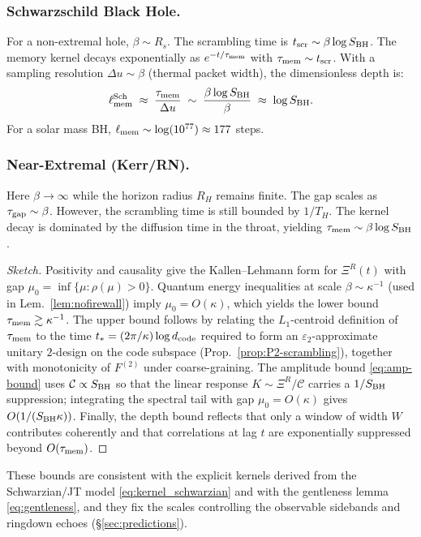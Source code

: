 \documentclass[aps,prd,preprint,onecolumn,superscriptaddress,nofootinbib,longbibliography,floatfix,11pt,showpacs,showkeys]{revtex4-2}
\theoremstyle{plain}
\theoremstyle{definition}
\theoremstyle{remark}
\begin{document}
\subsubsection{Schwarzschild Black Hole.}
For a non-extremal hole, $\beta \sim R_s$. The scrambling time is $t_{\rm scr} \sim \beta \log S_{\rm BH}$.
The memory kernel decays exponentially as $e^{-t/\tau_{\rm mem}}$ with $\tau_{\rm mem} \sim t_{\rm scr}$.
With a sampling resolution $\Delta u \sim \beta$ (thermal packet width), the dimensionless depth is:
\[
\ell_{\rm mem}^{\text{Sch}} \;\approx\; \frac{\tau_{\rm mem}}{\Delta u} \;\sim\; \frac{\beta \log S_{\rm BH}}{\beta} \;\approx\; \log S_{\rm BH}.
\]
For a solar mass BH, $\ell_{\rm mem} \sim \log(10^{77}) \approx 177$ steps.

\subsubsection{Near-Extremal (Kerr/RN).}
Here $\beta \to \infty$ while the horizon radius $R_H$ remains finite. The gap scales as $\tau_{\rm gap} \sim \beta$.
However, the scrambling time is still bounded by $1/T_H$.
The kernel decay is dominated by the diffusion time in the throat, yielding $\tau_{\rm mem} \sim \beta \log S_{\rm BH}$.

\begin{proof}[Sketch]
Positivity and causality give the Kallen--Lehmann form for $\Xi^R(t)$ with gap $\mu_0=\inf\{\mu:\rho(\mu)\!>\!0\}$. Quantum energy
inequalities at scale $\beta\sim\kappa^{-1}$ (used in Lem.~\ref{lem:nofirewall}) imply $\mu_0=O(\kappa)$, which yields the lower bound
$\tau_{\rm mem}\gtrsim \kappa^{-1}$. The upper bound follows by relating the $L_1$-centroid definition of $\tau_{\rm mem}$ to the time
$t_\ast=(2\pi/\kappa)\log d_{\rm code}$ required to form an $\varepsilon_2$-approximate unitary $2$-design on the code subspace (Prop.~\ref{prop:P2-scrambling}), together with monotonicity of $F^{(2)}$ under coarse-graining. The amplitude bound \eqref{eq:amp-bound} uses
$\mathcal{C}\propto S_{\rm BH}$ so that the linear response $K\!\sim\!\Xi^R/\mathcal{C}$ carries a $1/S_{\rm BH}$ suppression; integrating
the spectral tail with gap $\mu_0=O(\kappa)$ gives $O(1/(S_{\rm BH}\kappa))$. Finally, the depth bound reflects that only a window of width
$W$ contributes coherently and that correlations at lag $t$ are exponentially suppressed beyond $O(\tau_{\rm mem})$.
\end{proof}

These bounds are consistent with the explicit kernels derived from the Schwarzian/JT model \eqref{eq:kernel_schwarzian} and with the
gentleness lemma \eqref{eq:gentleness}, and they fix the scales controlling the observable sidebands and ringdown echoes
(\S\ref{sec:predictions}).
\end{document}
